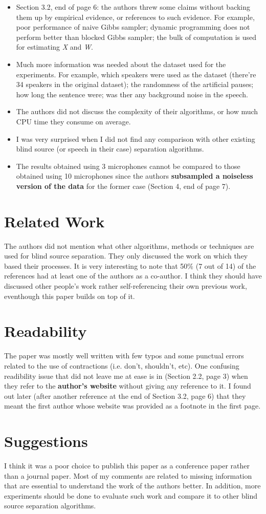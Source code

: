 \documentclass[11pt,a4paper]{article}
\begin{document}
\begin{itemize}
 \item Section 3.2, end of page 6: the authors threw some claims without backing them up by empirical evidence, or references to such evidence. For example,
poor performance of naive Gibbs sampler; dynamic programming does not perform better than blocked Gibbs sampler; the bulk of computation is used for estimating
 \textit{X} and \textit{W}.
 \item Much more information was needed about the dataset used for the experiments. For example, which speakers were used as the dataset (there're 34 speakers
in the original dataset); the randomness of the artificial pauses; how long the sentence were; was ther any background noise in the speech.
 \item The authors did not discuss the complexity of their algorithms, or how much CPU time they consume on average.
 \item I was very surprised when I did not find any comparison with other existing blind source (or speech in their case) separation algorithms.
 \item The results obtained using 3 microphones cannot be compared to those obtained using 10 microphones since the authors \textbf{subsampled a noiseless
version of the data} for the former case (Section 4, end of page 7).
\end{itemize}

\section{Related Work}
The authors did not mention what other algorithms, methods or techniques are used for blind source separation. They only discussed the work on which they based
their processes. It is very interesting to note that 50\% (7 out of 14) of the references had at least one of the authors as a co-author. I think they should
have discussed other people's work rather self-referencing their own previous work, eventhough this paper builds on top of it.

\section{Readability}
The paper was mostly well written with few typos and some punctual errors related to the use of contractions (i.e. don't, shouldn't, etc). One confusing
readibility issue that did not leave me at ease is in (Section 2.2, page 3) when they refer to the \textbf{author's website} without giving any reference to
it. I found out later (after another reference at the end of Section 3.2, page 6) that they meant the first author whose website was provided as a footnote in
the first page.

\section{Suggestions}
I think it was a poor choice to publish this paper as a conference paper rather than a journal paper. Most of my comments are related to missing information
that are essential to understand the work of the authors better. In addition, more experiments should be done to evaluate such work and compare it to other
blind source separation algorithms.
\end{document}
